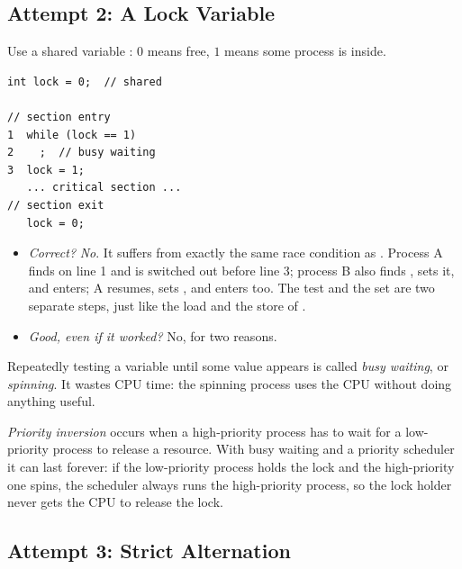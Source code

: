 \subsection{Attempt 2: A Lock Variable}

Use a shared variable : $0$ means free, $1$ means some process is inside.
\begin{lstlisting}
int lock = 0;  // shared

// section entry
1  while (lock == 1)
2    ;  // busy waiting
3  lock = 1;
   ... critical section ...
// section exit
   lock = 0;
\end{lstlisting}
\begin{itemize}
  \item \emph{Correct?} \emph{No}. It suffers from exactly the same race condition as . Process A finds  on line 1 and is switched out before line 3; process B also finds , sets it, and enters; A resumes, sets , and enters too. The test and the set are two separate steps, just like the load and the store of .
  \item \emph{Good, even if it worked?} No, for two reasons.
\end{itemize}

\begin{definition}
  Repeatedly testing a variable until some value appears is called \emph{busy waiting}, or \emph{spinning}. It wastes CPU time: the spinning process uses the CPU without doing anything useful.
\end{definition}

\begin{definition}
  \emph{Priority inversion} occurs when a high-priority process has to wait for a low-priority process to release a resource. With busy waiting and a priority scheduler it can last forever: if the low-priority process holds the lock and the high-priority one spins, the scheduler always runs the high-priority process, so the lock holder never gets the CPU to release the lock.
\end{definition}

\subsection{Attempt 3: Strict Alternation}

